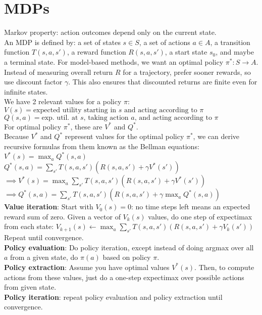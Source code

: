 \section{MDPs}
Markov property: action outcomes depend only on the current state. \\
An MDP is defined by: a set of states $s\in S$, a set of actions $a\in A$, a transition function $T(s,a,s')$, a reward function $R(s,a,s')$, a start state $s_0$, and maybe a terminal state. For model-based methods, we want an optimal policy $\pi^*:S\rightarrow A$. \\
Instead of measuring overall return $R$ for a trajectory, prefer sooner rewards, so use discount factor $\gamma$. This also ensures that discounted returns are finite even for infinite states. \\
We have 2 relevant values for a policy $\pi$:\\
$V(s)=\text{expected utility starting in $s$ and acting according to $\pi$}$\\
$Q(s, a)=\text{exp. util. at $s$, taking action $a$, and acting according to $\pi$}$\\
For optimal policy $\pi^*$, these are $V^*$ and $Q^*$. \\
Because $V^*$ and $Q^*$ represent values for the optimal policy $\pi^*$, we can derive recursive formulas from them known as the Bellman equations:\\
$V^*(s)=\max_{a}Q^*(s,a)$\\
$Q^*(s,a)=\sum_{s'}T(s,a,s')\left(R(s,a,s')+\gamma V^*(s')\right)$\\
$\implies V^*(s)=\max_{a}\sum_{s'}T(s,a,s')\left(R(s,a,s')+\gamma V^*(s')\right)$\\
$\implies Q^*(s,a)=\sum_{s'}T(s,a,s')\left(R(s,a,s')+\gamma\max_{a}Q^*(s,a)\right)$\\
\textbf{Value iteration}: Start with $V_{0}(s)=0$: no time steps left means an expected reward sum of zero. Given a vector of $V_k(s)$ values, do one step of expectimax from each state:
$V_{k+1}(s)\leftarrow\max_{a}\sum_{s'}T(s,a,s')\left(R(s,a,s')+\gamma V_k(s')\right)$\\
Repeat until convergence. \\
\textbf{Policy evaluation}: Do policy iteration, except instead of doing argmax over all $a$ from a given state, do $\pi(a)$ based on policy $\pi$. \\
\textbf{Policy extraction}: Assume you have optimal values $V^*(s)$. Then, to compute actions from these values, just do a one-step expectimax over possible actions from given state. \\
\textbf{Policy iteration}: repeat policy evaluation and policy extraction until convergence. \\